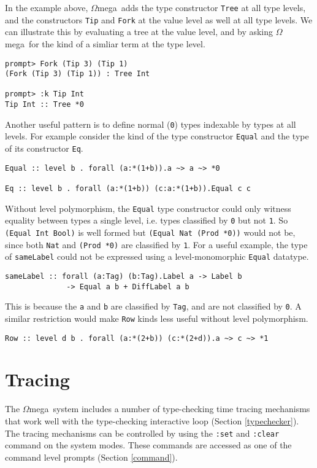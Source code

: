 \documentclass[11pt,twoside]{article}
\newcommand{\om}{$\Omega$mega}
\begin{document}
In the example above,
\om\ adds the type constructor {\tt Tree} at all type levels,
and the constructors {\tt Tip} and {\tt Fork} at the value level
as well at all type levels. We can illustrate this by evaluating
a tree at the value level, and by asking \om\ for the kind of
a simliar term at the type level.

\begin{verbatim}
prompt> Fork (Tip 3) (Tip 1)
(Fork (Tip 3) (Tip 1)) : Tree Int

prompt> :k Tip Int
Tip Int :: Tree *0
\end{verbatim}

Another useful pattern is to define normal ({\tt *0}) types indexable
by types at all levels. For example consider the kind of the type constructor
{\tt Equal} and the type of its constructor {\tt Eq}.

\begin{verbatim}
Equal :: level b . forall (a:*(1+b)).a ~> a ~> *0

Eq :: level b . forall (a:*(1+b)) (c:a:*(1+b)).Equal c c
\end{verbatim}
Without level polymorphism, the {\tt Equal} type constructor could only
witness equality between types a single level, i.e. types classified by
{\tt *0} but not {\tt *1}. So {\tt (Equal Int Bool)} is well formed
but {\tt (Equal Nat (Prod *0))} would not be, since both {\tt Nat}
and {\tt (Prod *0)} are classified by {\tt *1}. For a useful
example, the type of {\tt sameLabel} could not be expressed
using a level-monomorphic {\tt Equal} datatype.

\begin{verbatim}
sameLabel :: forall (a:Tag) (b:Tag).Label a -> Label b
              -> Equal a b + DiffLabel a b
\end{verbatim}
\noindent
This is because the {\tt a} and {\tt b} are classified by {\tt Tag}, and are not classified by {\tt *0}. A similar restriction would make
{\tt Row} kinds less useful without level polymorphism.


\begin{verbatim}
Row :: level d b . forall (a:*(2+b)) (c:*(2+d)).a ~> c ~> *1
\end{verbatim}


\section{Tracing}\label{tracing}

The \om\ system includes a number of type-checking time tracing mechanisms that work
well with the type-checking interactive loop (Section \ref{typechecker}). The tracing
mechanisms can be controlled by using the {\tt :set} and {\tt :clear} command
on the system modes. These commands are accessed as one of the
command level prompts (Section \ref{command}).
\end{document}
